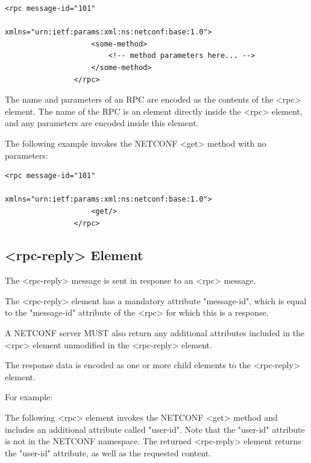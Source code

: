 \begin{lstlisting}[style=xmlStyle, caption={\textless{rpc}\textgreater{} Model.}, backgroundcolor=\color{codebackground}]
                <rpc message-id="101"
                        xmlns="urn:ietf:params:xml:ns:netconf:base:1.0">
                    <some-method>
                        <!-- method parameters here... -->
                    </some-method>
                </rpc>             
\end{lstlisting}


The name and parameters of an RPC are encoded as the contents of the
\textless{rpc}\textgreater{} element.  The name of the RPC is an element directly inside the
\textless{rpc}\textgreater{} element, and any parameters are encoded inside this element.

The following example invokes the NETCONF \textless{get}\textgreater{} method with no
   parameters:

\begin{lstlisting}[style=xmlStyle, caption={\textless{rpc}\textgreater{} \textless{get}\textgreater{} Model.}, backgroundcolor=\color{codebackground}]
                <rpc message-id="101"
                        xmlns="urn:ietf:params:xml:ns:netconf:base:1.0">
                    <get/>
                </rpc>           
\end{lstlisting}




\subsection*{\textless{rpc-reply}\textgreater{} Element}


The \textless{rpc-reply}\textgreater{} message is sent in response to an \textless{rpc}\textgreater{} message.

The \textless{rpc-reply}\textgreater{} element has a mandatory attribute "message-id", which
is equal to the "message-id" attribute of the \textless{rpc}\textgreater{} for which this is
a response.

A NETCONF server MUST also return any additional attributes included
in the \textless{rpc}\textgreater{} element unmodified in the \textless{rpc-reply}\textgreater{} element.

The response data is encoded as one or more child elements to the
\textless{rpc-reply}\textgreater{} element.

For example:

The following \textless{rpc}\textgreater{} element invokes the NETCONF \textless{get}\textgreater{} method and
includes an additional attribute called "user-id".  Note that the
"user-id" attribute is not in the NETCONF namespace.  The returned
\textless{rpc-reply}\textgreater{} element returns the "user-id" attribute, as well as the
requested content.

